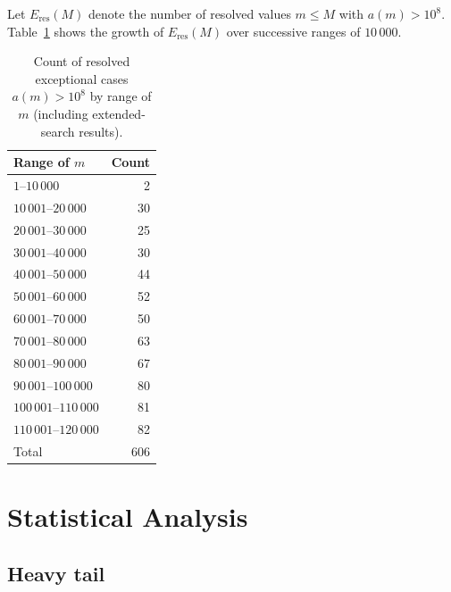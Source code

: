 \documentclass{amsart}
\theoremstyle{definition}
\theoremstyle{remark}
\numberwithin{equation}{section}
\begin{document}
Let $E_{\mathrm{res}}(M)$ denote the number of resolved values
$m \leq M$ with $a(m) > 10^8$.
Table~\ref{tab:growth} shows the growth of $E_{\mathrm{res}}(M)$ over
successive ranges of $10\,000$.

\begin{table}[ht]
	\centering
	\caption{Count of resolved exceptional cases $a(m) > 10^8$
		by range of $m$ (including extended-search results).}
	\label{tab:growth}
	\begin{tabular}{lr}
		\toprule
		Range of $m$ & Count \\
		\midrule
		$1$--$10\,000$         &   2 \\
		$10\,001$--$20\,000$   &  30 \\
		$20\,001$--$30\,000$   &  25 \\
		$30\,001$--$40\,000$   &  30 \\
		$40\,001$--$50\,000$   &  44 \\
		$50\,001$--$60\,000$   &  52 \\
		$60\,001$--$70\,000$   &  50 \\
		$70\,001$--$80\,000$   &  63 \\
		$80\,001$--$90\,000$   &  67 \\
		$90\,001$--$100\,000$  &  80 \\
		$100\,001$--$110\,000$ &  81 \\
		$110\,001$--$120\,000$ &  82 \\
		\midrule
		Total & 606 \\
		\bottomrule
	\end{tabular}
\end{table}

\section{Statistical Analysis}

\subsection{Heavy tail}
\end{document}
